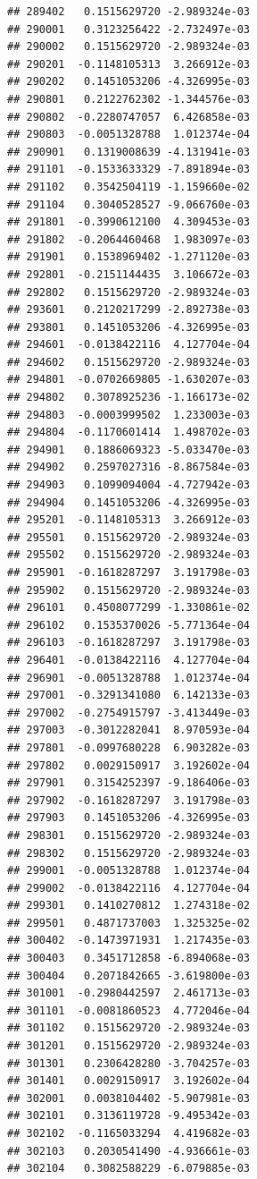 \begin{frame}[fragile]
\begin{verbatim}
## 289402   0.1515629720 -2.989324e-03
## 290001   0.3123256422 -2.732497e-03
## 290002   0.1515629720 -2.989324e-03
## 290201  -0.1148105313  3.266912e-03
## 290202   0.1451053206 -4.326995e-03
## 290801   0.2122762302 -1.344576e-03
## 290802  -0.2280747057  6.426858e-03
## 290803  -0.0051328788  1.012374e-04
## 290901   0.1319008639 -4.131941e-03
## 291101  -0.1533633329 -7.891894e-03
## 291102   0.3542504119 -1.159660e-02
## 291104   0.3040528527 -9.066760e-03
## 291801  -0.3990612100  4.309453e-03
## 291802  -0.2064460468  1.983097e-03
## 291901   0.1538969402 -1.271120e-03
## 292801  -0.2151144435  3.106672e-03
## 292802   0.1515629720 -2.989324e-03
## 293601   0.2120217299 -2.892738e-03
## 293801   0.1451053206 -4.326995e-03
## 294601  -0.0138422116  4.127704e-04
## 294602   0.1515629720 -2.989324e-03
## 294801  -0.0702669805 -1.630207e-03
## 294802   0.3078925236 -1.166173e-02
## 294803  -0.0003999502  1.233003e-03
## 294804  -0.1170601414  1.498702e-03
## 294901   0.1886069323 -5.033470e-03
## 294902   0.2597027316 -8.867584e-03
## 294903   0.1099094004 -4.727942e-03
## 294904   0.1451053206 -4.326995e-03
## 295201  -0.1148105313  3.266912e-03
## 295501   0.1515629720 -2.989324e-03
## 295502   0.1515629720 -2.989324e-03
## 295901  -0.1618287297  3.191798e-03
## 295902   0.1515629720 -2.989324e-03
## 296101   0.4508077299 -1.330861e-02
## 296102   0.1535370026 -5.771364e-04
## 296103  -0.1618287297  3.191798e-03
## 296401  -0.0138422116  4.127704e-04
## 296901  -0.0051328788  1.012374e-04
## 297001  -0.3291341080  6.142133e-03
## 297002  -0.2754915797 -3.413449e-03
## 297003  -0.3012282041  8.970593e-04
## 297801  -0.0997680228  6.903282e-03
## 297802   0.0029150917  3.192602e-04
## 297901   0.3154252397 -9.186406e-03
## 297902  -0.1618287297  3.191798e-03
## 297903   0.1451053206 -4.326995e-03
## 298301   0.1515629720 -2.989324e-03
## 298302   0.1515629720 -2.989324e-03
## 299001  -0.0051328788  1.012374e-04
## 299002  -0.0138422116  4.127704e-04
## 299301   0.1410270812  1.274318e-02
## 299501   0.4871737003  1.325325e-02
## 300402  -0.1473971931  1.217435e-03
## 300403   0.3451712858 -6.894068e-03
## 300404   0.2071842665 -3.619800e-03
## 301001  -0.2980442597  2.461713e-03
## 301101  -0.0081860523  4.772046e-04
## 301102   0.1515629720 -2.989324e-03
## 301201   0.1515629720 -2.989324e-03
## 301301   0.2306428280 -3.704257e-03
## 301401   0.0029150917  3.192602e-04
## 302001   0.0038104402 -5.907981e-03
## 302101   0.3136119728 -9.495342e-03
## 302102  -0.1165033294  4.419682e-03
## 302103   0.2030541490 -4.936661e-03
## 302104   0.3082588229 -6.079885e-03

\end{verbatim}
\end{frame}
